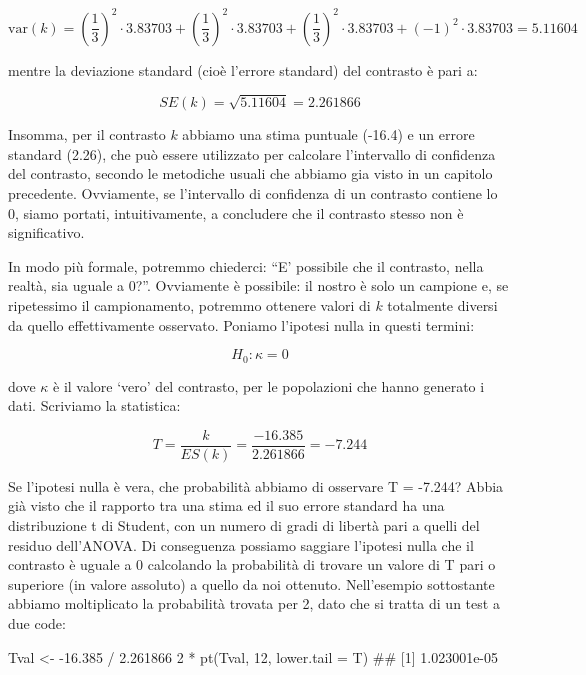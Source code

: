 \documentclass[a4paper,12pt,oneside]{book}
\newenvironment{Shaded}{\begin{snugshade}}{\end{snugshade}}
\newcommand{\DecValTok}[1]{#1}
\newcommand{\FloatTok}[1]{#1}
\newcommand{\SpecialCharTok}[1]{#1}
\newcommand{\DocumentationTok}[1]{#1}
\newcommand{\OtherTok}[1]{#1}
\newcommand{\FunctionTok}[1]{#1}
\newcommand{\AttributeTok}[1]{#1}
\newcommand{\NormalTok}[1]{#1}
\begin{document}
\[\textrm{var}(k) = \left( \frac{1}{3} \right)^2 \cdot 3.83703  +  \left( \frac{1}{3}\right)^2 \cdot 3.83703 + \left( \frac{1}{3}  \right)^2 \cdot 3.83703 + \left( - 1 \right)^2 \cdot 3.83703  = 5.11604\]

mentre la deviazione standard (cioè l'errore standard) del contrasto è pari a:

\[ SE(k) = \sqrt{5.11604} = 2.261866\]

Insomma, per il contrasto \(k\) abbiamo una stima puntuale (-16.4) e un errore standard (2.26), che può essere utilizzato per calcolare l'intervallo di confidenza del contrasto, secondo le metodiche usuali che abbiamo gia visto in un capitolo precedente. Ovviamente, se l'intervallo di confidenza di un contrasto contiene lo 0, siamo portati, intuitivamente, a concludere che il contrasto stesso non è significativo.

In modo più formale, potremmo chiederci: ``E' possibile che il contrasto, nella realtà, sia uguale a 0?''. Ovviamente è possibile: il nostro è solo un campione e, se ripetessimo il campionamento, potremmo ottenere valori di \(k\) totalmente diversi da quello effettivamente osservato. Poniamo l'ipotesi nulla in questi termini:

\[H_0: \kappa = 0\]

dove \(\kappa\) è il valore `vero' del contrasto, per le popolazioni che hanno generato i dati. Scriviamo la statistica:

\[T = \frac{k}{ES(k)} = \frac{-16.385}{2.261866} = -7.244\]

Se l'ipotesi nulla è vera, che probabilità abbiamo di osservare T = -7.244? Abbia già visto che il rapporto tra una stima ed il suo errore standard ha una distribuzione t di Student, con un numero di gradi di libertà pari a quelli del residuo dell'ANOVA. Di conseguenza possiamo saggiare l'ipotesi nulla che il contrasto è uguale a 0 calcolando la probabilità di trovare un valore di T pari o superiore (in valore assoluto) a quello da noi ottenuto. Nell'esempio sottostante abbiamo moltiplicato la probabilità trovata per 2, dato che si tratta di un test a due code:

\begin{Shaded}
\begin{Highlighting}[]
\NormalTok{Tval }\OtherTok{\textless{}{-}} \SpecialCharTok{{-}}\FloatTok{16.385} \SpecialCharTok{/} \FloatTok{2.261866}
\DecValTok{2} \SpecialCharTok{*} \FunctionTok{pt}\NormalTok{(Tval, }\DecValTok{12}\NormalTok{, }\AttributeTok{lower.tail =}\NormalTok{ T)}
\DocumentationTok{\#\# [1] 1.023001e{-}05}
\end{Highlighting}
\end{Shaded}
\end{document}
